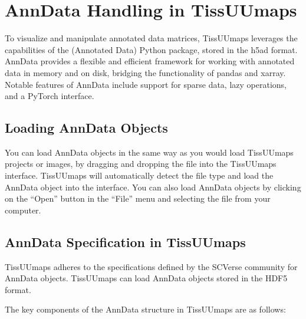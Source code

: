 \documentclass[letterpaper,10pt,english,openany,oneside]{sphinxmanual}
\begin{document}
\sphinxstepscope


\section{AnnData Handling in TissUUmaps}
\label{\detokenize{docs/advanced/anndata:anndata-handling-in-tissuumaps}}\label{\detokenize{docs/advanced/anndata::doc}}
\sphinxAtStartPar
To visualize and manipulate annotated data matrices, TissUUmaps leverages the capabilities of the  (Annotated Data) Python package, stored in the h5ad format. AnnData provides a flexible and efficient framework for working with annotated data in memory and on disk, bridging the functionality of pandas and xarray. Notable features of AnnData include support for sparse data, lazy operations, and a PyTorch interface.


\subsection{Loading AnnData Objects}
\label{\detokenize{docs/advanced/anndata:loading-anndata-objects}}
\sphinxAtStartPar
You can load AnnData objects in the same way as you would load TissUUmaps projects or images, by dragging and dropping the file into the TissUUmaps interface. TissUUmaps will automatically detect the file type and load the AnnData object into the interface. You can also load AnnData objects by clicking on the “Open” button in the “File” menu and selecting the file from your computer.


\subsection{AnnData Specification in TissUUmaps}
\label{\detokenize{docs/advanced/anndata:anndata-specification-in-tissuumaps}}
\sphinxAtStartPar
TissUUmaps adheres to the specifications defined by the SCVerse community for AnnData objects. TissUUmaps can load AnnData objects stored in the HDF5 format.

\sphinxAtStartPar
The key components of the AnnData structure in TissUUmaps are as follows:
\end{document}
